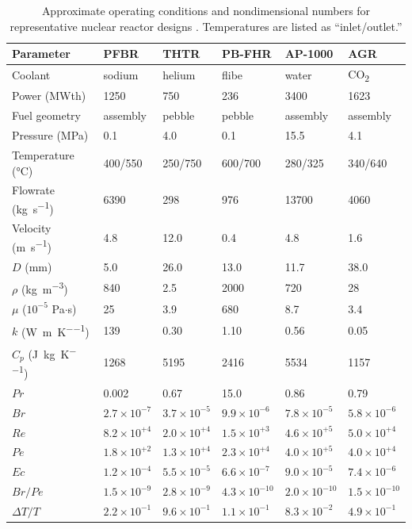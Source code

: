 \begin{table}[!h]
\caption{Approximate operating conditions and nondimensional numbers for representative nuclear reactor designs \cite{pfbr,pfbrTH,thtr_1990,pbfhr,ap1000,ap1000_2,nonbol}. Temperatures are listed as ``inlet/outlet.''}
\centering
\begin{tabular}{@{}l l l l l l@{}}
\toprule
\textbf{Parameter} & \textbf{PFBR} & \textbf{THTR} & \textbf{PB-FHR} & \textbf{AP-1000} & \textbf{AGR}\\
\midrule
Coolant							& sodium			& helium				& \gls{flibe}				& water				& CO\textsubscript{2}\\
Power (MWth)				& 1250			& 750				& 236				& 3400				& 1623\\
Fuel	 geometry							& assembly		& pebble				& pebble				& assembly			& assembly\\
Pressure (\si{\mega\pascal})						& 0.1				& 4.0					& 0.1					& 15.5				& 4.1\\
Temperature (\si{\celsius})				& 400/550		& 250/750				& 600/700				& 280/325				& 340/640\\
Flowrate (\si{\kilo\gram\per\second})						& 6390			& 298				& 976				& 13700				& 4060\\
Velocity (\si{\meter\per\second})						& 4.8				& 12.0				& 0.4					& 4.8				& 1.6\\
 \(D\) (mm)						& 5.0				& 26.0				& 13.0				& 11.7			& 38.0\\
 \(\rho\) (\si{\kilo\gram\per\cubic\meter})			& 840			& 2.5					& 2000				& 720			& 28\\
 \(\mu\) (\(10^{-5}\) Pa\(\cdot\)s)			& 25				& 3.9					& 680				& 8.7				& 3.4\\
 \(k\) (\si{\watt\per\meter\per\kelvin})					& 139			& 0.30				& 1.10				& 0.56			& 0.05\\
 \(C_p\) (\si{\joule\per\kilo\gram\per\kelvin})				& 1268			& 5195				& 2416				& 5534			& 1157\\
 \(Pr\)							& 0.002			& 0.67				& 15.0				& 0.86			& 0.79\\
 \(Br\)							& \(2.7\times10^{-7}\)& \(3.7\times10^{-5}\)	& \(9.9\times10^{-6}\)	& \(7.8\times10^{-5}\)	& \(5.8\times10^{-6}\)\\
 \(Re\)							& \(8.2\times10^{+4}\)	& \(2.0\times10^{+4}\)		& \(1.5\times10^{+3}\)		& \(4.6\times10^{+5}\)		& \(5.0\times10^{+4}\)\\
 \(Pe\)							& \(1.8\times10^{+2}\)	& \(1.3\times10^{+4}\)		& \(2.3\times10^{+4}\)		& \(4.0\times10^{+5}\)		& \(4.0\times10^{+4}\)\\
 \(Ec\) & \(1.2\times10^{-4}\) & \(5.5\times10^{-5}\) & \(6.6\times10^{-7}\) & \(9.0\times10^{-5}\) & \(7.4\times10^{-6}\)\\
 \(Br/Pe\)							& \(1.5\times10^{-9}\)& \(2.8\times10^{-9}\)	& \(4.3\times10^{-10}\)	& \(2.0\times10^{-10}\)	& \(1.5\times10^{-10}\)\\
 \(\Delta T/T\) & \(2.2\times10^{-1}\) & \(9.6\times10^{-1}\) & \(1.1\times10^{-1}\) & \(8.3\times10^{-2}\) & \(4.9\times10^{-1}\)\\
\bottomrule
\end{tabular}
\label{table:TypicalData}
\end{table}


